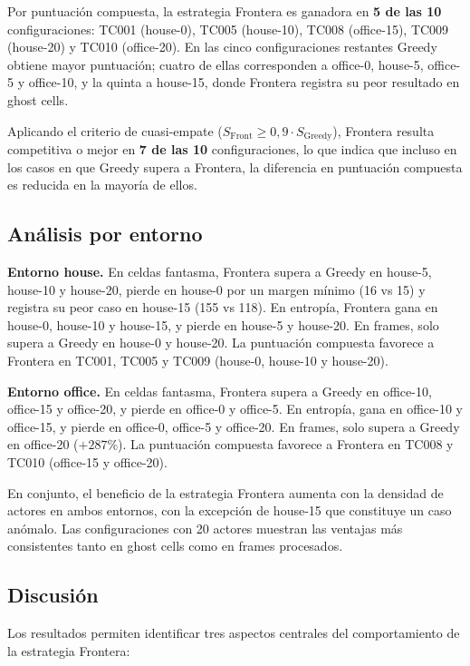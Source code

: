 Por puntuación compuesta, la estrategia Frontera es ganadora en \textbf{5 de las 10} configuraciones: TC001 (house-0), TC005 (house-10), TC008 (office-15), TC009 (house-20) y TC010 (office-20). En las cinco configuraciones restantes Greedy obtiene mayor puntuación; cuatro de ellas corresponden a office-0, house-5, office-5 y office-10, y la quinta a house-15, donde Frontera registra su peor resultado en ghost cells.

Aplicando el criterio de cuasi-empate ($S_{\text{Front}} \geq 0{,}9 \cdot S_{\text{Greedy}}$), Frontera resulta competitiva o mejor en \textbf{7 de las 10} configuraciones, lo que indica que incluso en los casos en que Greedy supera a Frontera, la diferencia en puntuación compuesta es reducida en la mayoría de ellos.

\subsection{Análisis por entorno}

\textbf{Entorno house.} En celdas fantasma, Frontera supera a Greedy en house-5, house-10 y house-20, pierde en house-0 por un margen mínimo (16 vs 15) y registra su peor caso en house-15 (155 vs 118). En entropía, Frontera gana en house-0, house-10 y house-15, y pierde en house-5 y house-20. En frames, solo supera a Greedy en house-0 y house-20. La puntuación compuesta favorece a Frontera en TC001, TC005 y TC009 (house-0, house-10 y house-20).

\textbf{Entorno office.} En celdas fantasma, Frontera supera a Greedy en office-10, office-15 y office-20, y pierde en office-0 y office-5. En entropía, gana en office-10 y office-15, y pierde en office-0, office-5 y office-20. En frames, solo supera a Greedy en office-20 ($+287\%$). La puntuación compuesta favorece a Frontera en TC008 y TC010 (office-15 y office-20).

En conjunto, el beneficio de la estrategia Frontera aumenta con la densidad de actores en ambos entornos, con la excepción de house-15 que constituye un caso anómalo. Las configuraciones con 20 actores muestran las ventajas más consistentes tanto en ghost cells como en frames procesados.

\subsection{Discusión}%
\label{sec:exp_e1_discusion}

Los resultados permiten identificar tres aspectos centrales del comportamiento de la estrategia Frontera:

